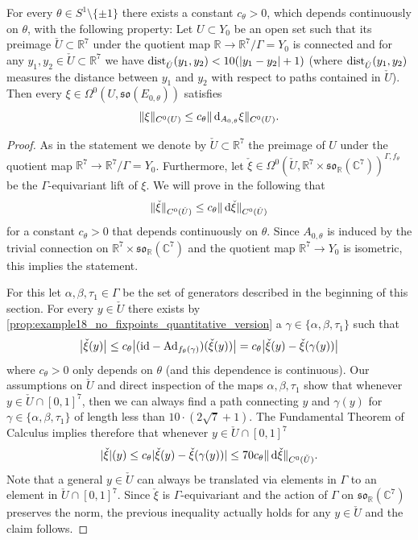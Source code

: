 \documentclass[11pt,a4paper]{scrartcl}
\newcommand*\diff{\mathop{}\!\textup{d}}
\newcommand{\Ad}{\textup{Ad}}
\newcommand{\id}{\textup{id}}
\newcommand{\VertC}[2]{\Vert_{C^{{#1}}{#2}}}
\numberwithin{equation}{section}
\theoremstyle{plain}
\theoremstyle{definition}
\theoremstyle{remark}
\begin{document}
\begin{proposition}\label{prop:example18_Poincare-type-estimate}
For every $\theta\in S^1 \setminus \{\pm 1\}$ there exists a constant $c_\theta>0$, which depends continuously on $\theta$, with the following property: Let $U\subset Y_0$ be an open set such that its preimage $\check{U} \subset \mathbb{R}^7$ under the quotient map $\mathbb{R} \to \mathbb{R}^7/\Gamma=Y_0$ is connected and for any $y_1,y_2 \in \check{U}\subset \mathbb{R}^7$ we have $\textup{dist}_{\check{U}}(y_1,y_2)< 10 (\vert y_1-y_2 \vert + 1)$ (where $\textup{dist}_{\check{U}}(y_1,y_2)$ measures the distance between $y_1$ and $y_2$ with respect to paths contained in $\check{U}$). Then every $\xi \in \Omega^0(U,\mathfrak{so}(E_{0,\theta}))$ satisfies \[ \Vert \xi \VertC{0}{(U)} \leq c_\theta \Vert \diff_{A_{0,\theta}} \xi \VertC{0}{(U)}. \]
\end{proposition}
\begin{proof}
As in the statement we denote by $\check{U}\subset \mathbb{R}^7$ the preimage of $U$ under the quotient map $\mathbb{R}^7 \to \mathbb{R}^7/\Gamma =Y_0$. Furthermore, let $\check{\xi}\in \Omega^0(\check{U},\mathbb{R}^7\times \mathfrak{so}_{\mathbb{R}}(\mathbb{C}^7))^{\Gamma,f_\theta}$ be the $\Gamma$-equivariant lift of $\xi$. We will prove in the following that \[ \Vert \check{\xi} \VertC{0}{(\check{U})} \leq c_\theta \Vert \diff \check{\xi} \VertC{0}{(\check{U})} \] for a constant $c_\theta>0$ that depends continuously on $\theta$. Since $A_{0,\theta}$ is induced by the trivial connection on $\mathbb{R}^7 \times \mathfrak{so}_{\mathbb{R}}(\mathbb{C}^7)$ and the quotient map $\mathbb{R}^7\to Y_0$ is isometric, this implies the statement.

For this let $\alpha,\beta,\tau_1 \in \Gamma$ be the set of generators described in the beginning of this section. For every $y\in \check{U}$ there exists by \autoref{prop:example18_no_fixpoints_quantitative_version} a $\gamma \in \{\alpha,\beta,\tau_1\}$ such that \[ \big\vert \check{\xi}(y) \big\vert \leq c_\theta \big\vert(\id -\Ad_{f_\theta(\gamma)})(\check{\xi}(y)) \big\vert = c_\theta \big\vert \check{\xi}(y) - \check{\xi}(\gamma(y)) \big\vert\] where $c_\theta>0$ only depends on $\theta$ (and this dependence is continuous). Our assumptions on $\check{U}$ and direct inspection of the maps $\alpha,\beta,\tau_1$ show that whenever $y \in \check{U} \cap [0,1]^7$, then we can always find a path connecting $y$ and $\gamma(y)$ for $\gamma \in \{\alpha,\beta,\tau_1\}$ of length less than $10 \cdot (2\sqrt{7}+1)$. The Fundamental Theorem of Calculus implies therefore that whenever $y \in \check{U}\cap [0,1]^7$ \[ \vert \check{\xi} \vert(y) \leq c_{\theta} \vert \check{\xi}(y) - \check{\xi}(\gamma(y)) \vert \leq 70 c_{\theta} \Vert \diff \check{\xi} \VertC{0}{(\check{U})}. \] Note that a general $y \in \check{U}$ can always be translated via elements in $\Gamma$ to an element in $\check{U}\cap [0,1]^7$. Since $\check{\xi}$ is $\Gamma$-equivariant and the action of $\Gamma$ on $\mathfrak{so}_{\mathbb{R}}(\mathbb{C}^7)$ preserves the norm, the previous inequality actually holds for any $y \in \check{U}$ and the claim follows.
\end{proof}
\end{document}
